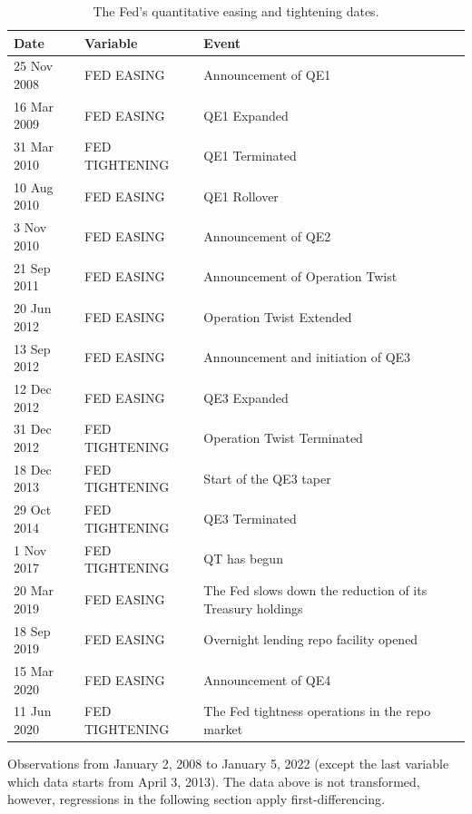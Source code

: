 \documentclass[11pt,a4paper,english,oneside]{article}
\begin{document}
\begin{appendices}
\begin{table}[!h] \centering
\begin{threeparttable}
\caption{The Fed's quantitative easing and tightening dates.}
\label{table:fed}
\begin{tabular}{lll}
\toprule
Date & Variable & Event \\
\midrule
25 Nov 2008 & FED EASING & Announcement of QE1 \\
16 Mar 2009 & FED EASING & QE1 Expanded \\
31 Mar 2010 & FED TIGHTENING & QE1 Terminated \\
10 Aug 2010 & FED EASING & QE1 Rollover \\
3 Nov 2010 & FED EASING & Announcement of QE2 \\
21 Sep 2011 & FED EASING & Announcement of Operation Twist \\
20 Jun 2012 & FED EASING & Operation Twist Extended \\
13 Sep 2012 & FED EASING & Announcement and initiation of QE3 \\
12 Dec 2012 & FED EASING & QE3 Expanded \\
31 Dec 2012 & FED TIGHTENING & Operation Twist Terminated \\
18 Dec 2013 & FED TIGHTENING & Start of the QE3 taper \\
29 Oct 2014 & FED TIGHTENING & QE3 Terminated \\
1 Nov 2017 & FED TIGHTENING & QT has begun \\
20 Mar 2019 & FED EASING & The Fed slows down the reduction of its Treasury holdings \\
18 Sep 2019 & FED EASING & Overnight lending repo facility opened \\
15 Mar 2020 & FED EASING & Announcement of QE4 \\
11 Jun 2020 & FED TIGHTENING & The Fed tightness operations in the repo market \\
\bottomrule
\end{tabular}
Observations from January 2, 2008 to January 5, 2022 (except the last variable which data starts from April 3, 2013). The data above is not transformed, however, regressions in the following section apply first-differencing.
\end{threeparttable}
\end{table}


\end{appendices}
\end{document}
